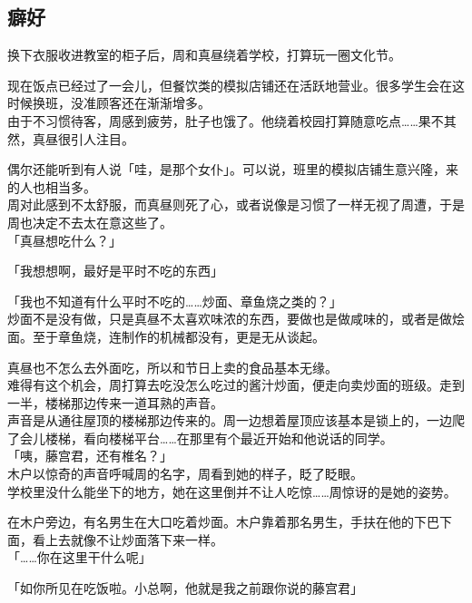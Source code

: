 \subsection{癖好}

换下衣服收进教室的柜子后，周和真昼绕着学校，打算玩一圈文化节。

现在饭点已经过了一会儿，但餐饮类的模拟店铺还在活跃地营业。很多学生会在这时候换班，没准顾客还在渐渐增多。\\

由于不习惯待客，周感到疲劳，肚子也饿了。他绕着校园打算随意吃点……果不其然，真昼很引人注目。

偶尔还能听到有人说「哇，是那个女仆」。可以说，班里的模拟店铺生意兴隆，来的人也相当多。\\

周对此感到不太舒服，而真昼则死了心，或者说像是习惯了一样无视了周遭，于是周也决定不去太在意这些了。\\

「真昼想吃什么？」

「我想想啊，最好是平时不吃的东西」

「我也不知道有什么平时不吃的……炒面、章鱼烧之类的？」\\

炒面不是没有做，只是真昼不太喜欢味浓的东西，要做也是做咸味的，或者是做烩面。至于章鱼烧，连制作的机械都没有，更是无从谈起。

真昼也不怎么去外面吃，所以和节日上卖的食品基本无缘。\\

难得有这个机会，周打算去吃没怎么吃过的酱汁炒面，便走向卖炒面的班级。走到一半，楼梯那边传来一道耳熟的声音。\\

声音是从通往屋顶的楼梯那边传来的。周一边想着屋顶应该基本是锁上的，一边爬了会儿楼梯，看向楼梯平台……在那里有个最近开始和他说话的同学。\\

「咦，藤宫君，还有椎名？」\\

木户以惊奇的声音呼喊周的名字，周看到她的样子，眨了眨眼。\\

学校里没什么能坐下的地方，她在这里倒并不让人吃惊……周惊讶的是她的姿势。

在木户旁边，有名男生在大口吃着炒面。木户靠着那名男生，手扶在他的下巴下面，看上去就像不让炒面落下来一样。\\

「……你在这里干什么呢」

「如你所见在吃饭啦。小总啊，他就是我之前跟你说的藤宫君」

